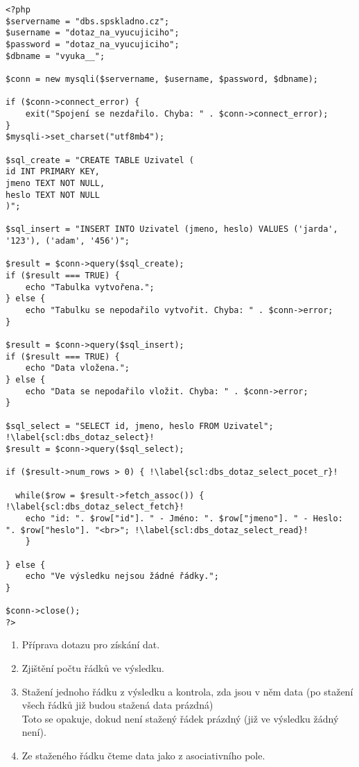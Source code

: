 \begin{minipage}[t]{.45\textwidth}
\begin{code}
\begin{verbatim}
<?php
$servername = "dbs.spskladno.cz"; 
$username = "dotaz_na_vyucujiciho";
$password = "dotaz_na_vyucujiciho";
$dbname = "vyuka__";

$conn = new mysqli($servername, $username, $password, $dbname); 

if ($conn->connect_error) { 
    exit("Spojení se nezdařilo. Chyba: " . $conn->connect_error);
}
$mysqli->set_charset("utf8mb4");

$sql_create = "CREATE TABLE Uzivatel ( 
id INT PRIMARY KEY,
jmeno TEXT NOT NULL,
heslo TEXT NOT NULL
)";

$sql_insert = "INSERT INTO Uzivatel (jmeno, heslo) VALUES ('jarda', '123'), ('adam', '456')"; 

$result = $conn->query($sql_create);
if ($result === TRUE) {
    echo "Tabulka vytvořena.";
} else {
    echo "Tabulku se nepodařilo vytvořit. Chyba: " . $conn->error;
}

$result = $conn->query($sql_insert); 
if ($result === TRUE) {	
    echo "Data vložena.";
} else {
    echo "Data se nepodařilo vložit. Chyba: " . $conn->error;
}

$sql_select = "SELECT id, jmeno, heslo FROM Uzivatel"; !\label{scl:dbs_dotaz_select}!
$result = $conn->query($sql_select);

if ($result->num_rows > 0) { !\label{scl:dbs_dotaz_select_pocet_r}!

  while($row = $result->fetch_assoc()) { !\label{scl:dbs_dotaz_select_fetch}!
    echo "id: ". $row["id"]. " - Jméno: ". $row["jmeno"]. " - Heslo: ". $row["heslo"]. "<br>"; !\label{scl:dbs_dotaz_select_read}!
    }
    
} else {
    echo "Ve výsledku nejsou žádné řádky.";
}

$conn->close();
?> 
\end{verbatim}

\label{code:php_dbs_select}
\end{code}
\end{minipage}
\begin{minipage}[t]{.45\textwidth}
\begin{enumerate}
\item[ř. \ref{scl:dbs_dotaz_select}:] Příprava dotazu pro získání dat.
\item[ř. \ref{scl:dbs_dotaz_select_pocet_r}:] Zjištění počtu řádků ve výsledku.
\vspace{3cm}
\item[ř. \ref{scl:dbs_dotaz_select_fetch}:] Stažení jednoho řádku z výsledku a kontrola, zda jsou v něm data (po stažení všech řádků již budou stažená data prázdná)\\
Toto se opakuje, dokud není stažený řádek prázdný (již ve výsledku žádný není).
\vspace{1.2cm}
\item[ř. \ref{scl:dbs_dotaz_select_read}:] Ze staženého řádku čteme data jako z asociativního pole. 
\end{enumerate}
\end{minipage}

